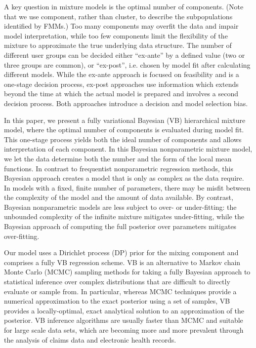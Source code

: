 \documentclass[a4paper,UKenglish]{oasics}
\begin{document}
A key question in mixture models is the optimal number of components. (Note that we use component, rather than cluster, to describe the subpopulations identified by FMMs.) Too many components may overfit the data and impair model interpretation, while too few components limit the flexibility of the mixture to approximate the true underlying data structure.
The number of different user groups can be decided either ``ex-ante'' by a defined value (two or three groups are common), or ``ex-post'', i.e. chosen by model fit after calculating different models. 
While the ex-ante approach is focused on feasibility and is a one-stage decision process, ex-post approaches use information which extends beyond the time at which the actual model is prepared and involves a second decision process. Both approaches introduce a decision and model selection bias.

In this paper, we present a fully variational Bayesian (VB) hierarchical mixture model, where the optimal number of components is evaluated during model fit. This one-stage process yields both the ideal number of components and allows interpretation of each component. 
In this Bayesian nonparametric mixture model, we let the data determine both the number and the form of the local mean functions. In contrast to frequentist nonparametric regression methods, this Bayesian approach creates a model that is only as complex as the data require.~\cite{hannah} In models with a fixed, finite number of parameters, there may be misfit between the complexity of the model and the amount of data available. By contrast, Bayesian nonparametric models are less subject to over- or under-fitting: the unbounded complexity of the infinite mixture mitigates under-fitting, while the Bayesian approach of computing the full posterior over parameters mitigates over-fitting.~\cite{rasmussen}

Our model uses a Dirichlet process (DP) prior for the mixing component and comprises a fully VB regression scheme. VB is an alternative to Markov chain Monte Carlo (MCMC) sampling methods for taking a fully Bayesian approach to statistical inference over complex distributions that are difficult to directly evaluate or sample from. In particular, whereas MCMC techniques provide a numerical approximation to the exact posterior using a set of samples, VB provides a locally-optimal, exact analytical solution to an approximation of the posterior.
VB inference algorithms are usually faster than MCMC and suitable for large scale data sets, which are becoming more and more prevalent through the analysis of claims data and electronic health records.
\end{document}

